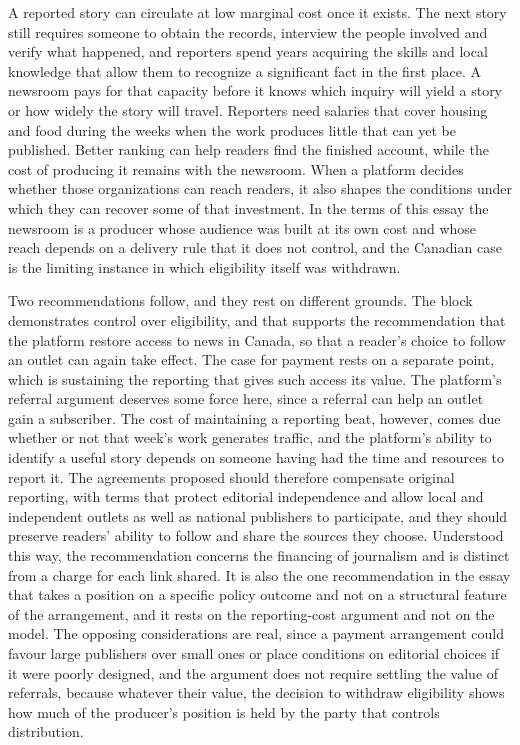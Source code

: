 \documentclass[11pt]{article}
\theoremstyle{definition}
\begin{document}
A reported story can circulate at low marginal cost once it exists. The next story still requires someone to obtain the records, interview the people involved and verify what happened, and reporters spend years acquiring the skills and local knowledge that allow them to recognize a significant fact in the first place. A newsroom pays for that capacity before it knows which inquiry will yield a story or how widely the story will travel. Reporters need salaries that cover housing and food during the weeks when the work produces little that can yet be published. Better ranking can help readers find the finished account, while the cost of producing it remains with the newsroom. When a platform decides whether those organizations can reach readers, it also shapes the conditions under which they can recover some of that investment. In the terms of this essay the newsroom is a producer whose audience was built at its own cost and whose reach depends on a delivery rule that it does not control, and the Canadian case is the limiting instance in which eligibility itself was withdrawn.

Two recommendations follow, and they rest on different grounds. The block demonstrates control over eligibility, and that supports the recommendation that the platform restore access to news in Canada, so that a reader's choice to follow an outlet can again take effect. The case for payment rests on a separate point, which is sustaining the reporting that gives such access its value. The platform's referral argument deserves some force here, since a referral can help an outlet gain a subscriber. The cost of maintaining a reporting beat, however, comes due whether or not that week's work generates traffic, and the platform's ability to identify a useful story depends on someone having had the time and resources to report it. The agreements proposed should therefore compensate original reporting, with terms that protect editorial independence and allow local and independent outlets as well as national publishers to participate, and they should preserve readers' ability to follow and share the sources they choose. Understood this way, the recommendation concerns the financing of journalism and is distinct from a charge for each link shared. It is also the one recommendation in the essay that takes a position on a specific policy outcome and not on a structural feature of the arrangement, and it rests on the reporting-cost argument and not on the model. The opposing considerations are real, since a payment arrangement could favour large publishers over small ones or place conditions on editorial choices if it were poorly designed, and the argument does not require settling the value of referrals, because whatever their value, the decision to withdraw eligibility shows how much of the producer's position is held by the party that controls distribution.
\end{document}
